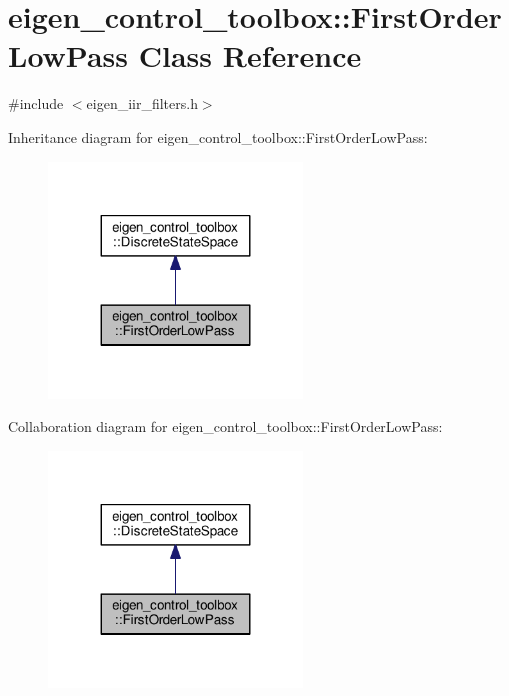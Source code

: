 \hypertarget{classeigen__control__toolbox_1_1_first_order_low_pass}{}\section{eigen\+\_\+control\+\_\+toolbox\+:\+:First\+Order\+Low\+Pass Class Reference}
\label{classeigen__control__toolbox_1_1_first_order_low_pass}


{\ttfamily \#include $<$eigen\+\_\+iir\+\_\+filters.\+h$>$}



Inheritance diagram for eigen\+\_\+control\+\_\+toolbox\+:\+:First\+Order\+Low\+Pass\+:
\nopagebreak
\begin{figure}[H]
\begin{center}
\leavevmode
\includegraphics[width=191pt]{classeigen__control__toolbox_1_1_first_order_low_pass__inherit__graph}
\end{center}
\end{figure}


Collaboration diagram for eigen\+\_\+control\+\_\+toolbox\+:\+:First\+Order\+Low\+Pass\+:
\nopagebreak
\begin{figure}[H]
\begin{center}
\leavevmode
\includegraphics[width=191pt]{classeigen__control__toolbox_1_1_first_order_low_pass__coll__graph}
\end{center}
\end{figure}
